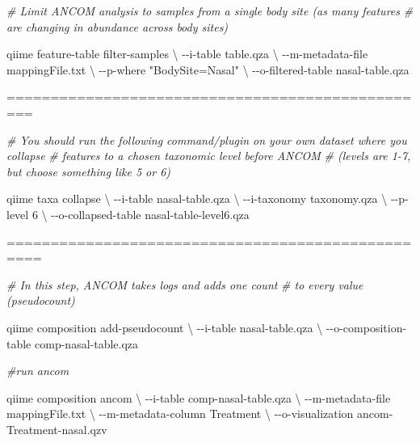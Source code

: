 \documentclass[
]{book}
\newenvironment{Shaded}{\begin{snugshade}}{\end{snugshade}}
\newcommand{\CommentTok}[1]{\textcolor[rgb]{0.56,0.35,0.01}{\textit{#1}}}
\newcommand{\DataTypeTok}[1]{\textcolor[rgb]{0.13,0.29,0.53}{#1}}
\newcommand{\ExtensionTok}[1]{#1}
\newcommand{\NormalTok}[1]{#1}
\newcommand{\StringTok}[1]{\textcolor[rgb]{0.31,0.60,0.02}{#1}}
\begin{document}
\begin{Shaded}
\begin{Highlighting}[]
\CommentTok{\# Limit ANCOM analysis to samples from a single body site (as many features }
\CommentTok{\# are changing in abundance across body sites)}

\ExtensionTok{qiime}\NormalTok{ feature{-}table filter{-}samples }\DataTypeTok{\textbackslash{}}
\NormalTok{{-}{-}i{-}table table.qza }\DataTypeTok{\textbackslash{}}
\NormalTok{{-}{-}m{-}metadata{-}file mappingFile.txt }\DataTypeTok{\textbackslash{}}
\NormalTok{{-}{-}p{-}where }\StringTok{"BodySite=\textquotesingle{}Nasal\textquotesingle{}"} \DataTypeTok{\textbackslash{}}
\NormalTok{{-}{-}o{-}filtered{-}table nasal{-}table.qza}

\ExtensionTok{=================================================}

\CommentTok{\# You should run the following command/plugin on your own dataset where you collapse }
\CommentTok{\# features to a chosen taxonomic level before ANCOM }
\CommentTok{\# (levels are 1{-}7, but choose something like 5 or 6)}

\ExtensionTok{qiime}\NormalTok{ taxa collapse }\DataTypeTok{\textbackslash{}}
\NormalTok{{-}{-}i{-}table nasal{-}table.qza }\DataTypeTok{\textbackslash{}}
\NormalTok{{-}{-}i{-}taxonomy taxonomy.qza }\DataTypeTok{\textbackslash{}}
\NormalTok{{-}{-}p{-}level 6 }\DataTypeTok{\textbackslash{}}
\NormalTok{{-}{-}o{-}collapsed{-}table nasal{-}table{-}level6.qza}

\ExtensionTok{==================================================}

\CommentTok{\# In this step, ANCOM takes logs and adds one count }
\CommentTok{\# to every value (pseudocount)}

\ExtensionTok{qiime}\NormalTok{ composition add{-}pseudocount }\DataTypeTok{\textbackslash{}}
\NormalTok{{-}{-}i{-}table nasal{-}table.qza }\DataTypeTok{\textbackslash{}}
\NormalTok{{-}{-}o{-}composition{-}table comp{-}nasal{-}table.qza}

\CommentTok{\#run ancom }

\ExtensionTok{qiime}\NormalTok{ composition ancom }\DataTypeTok{\textbackslash{}}
\NormalTok{{-}{-}i{-}table comp{-}nasal{-}table.qza }\DataTypeTok{\textbackslash{}}
\NormalTok{{-}{-}m{-}metadata{-}file mappingFile.txt }\DataTypeTok{\textbackslash{}}
\NormalTok{{-}{-}m{-}metadata{-}column Treatment }\DataTypeTok{\textbackslash{}}
\NormalTok{{-}{-}o{-}visualization ancom{-}Treatment{-}nasal.qzv}
\end{Highlighting}
\end{Shaded}
\end{document}
